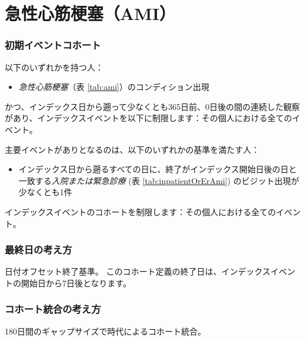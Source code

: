 \documentclass[
  11pt]{book}
\providecommand{\tightlist}{%
  \setlength{\itemsep}{0pt}\setlength{\parskip}{0pt}}
\theoremstyle{definition}
\theoremstyle{definition}
\theoremstyle{definition}
\theoremstyle{definition}
\theoremstyle{remark}
\begin{document}
\section{急性心筋梗塞（AMI）}\label{Ami}

\subsubsection*{初期イベントコホート}\label{ux521dux671fux30a4ux30d9ux30f3ux30c8ux30b3ux30dbux30fcux30c8}

以下のいずれかを持つ人：

\begin{itemize}
\tightlist
\item
  \emph{急性心筋梗塞}（表 \ref{tab:ami}）のコンディション出現
\end{itemize}

かつ、インデックス日から遡って少なくとも365日前、0日後の間の連続した観察があり、インデックスイベントを以下に制限します：その個人における全てのイベント。

主要イベントがありとなるのは、以下のいずれかの基準を満たす人：

\begin{itemize}
\tightlist
\item
  インデックス日から遡るすべての日に、終了がインデックス開始日後の日と一致する\emph{入院または緊急診療} (表 \ref{tab:inpatientOrErAmi}) のビジット出現が少なくとも1件
\end{itemize}

インデックスイベントのコホートを制限します：その個人における全てのイベント。

\subsubsection*{最終日の考え方}\label{ux6700ux7d42ux65e5ux306eux8003ux3048ux65b9-1}

日付オフセット終了基準。
このコホート定義の終了日は、インデックスイベントの開始日から7日後となります。

\subsubsection*{コホート統合の考え方}\label{ux30b3ux30dbux30fcux30c8ux7d71ux5408ux306eux8003ux3048ux65b9-1}

180日間のギャップサイズで時代によるコホート統合。
\end{document}
